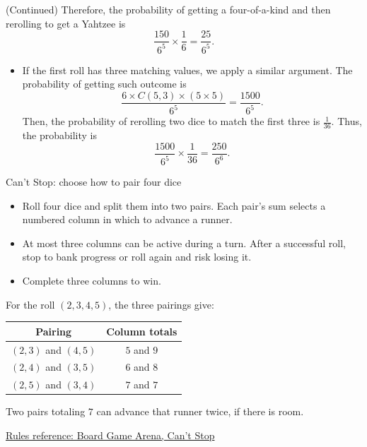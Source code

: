 \begin{frame}
\begin{sol} (Continued)
Therefore, the probability of getting a four-of-a-kind and then rerolling to get a Yahtzee is 
\[\frac{150}{6^5} \times \frac{1}{6} = \frac{25}{6^5}.\]
\begin{itemize}
\item If the first roll has three matching values, we apply a similar argument. The probability of getting such outcome is 
\[\frac{6 \times C(5,3) \times (5 \times 5)}{6^5} = \frac{1500}{6^5}.\] 
Then, the probability of rerolling two dice to match the first three is $\frac{1}{36}$. Thus, the probability is 
\[\frac{1500}{6^5} \times \frac{1}{36} = \frac{250}{6^6}.\]
\end{itemize}
\end{sol}
\end{frame}

\begin{frame}{Can't Stop: choose how to pair four dice}
\small
\begin{itemize}
\item Roll four dice and split them into two pairs. Each pair's sum
selects a numbered column in which to advance a runner.
\item At most three columns can be active during a turn. After a
successful roll, stop to bank progress or roll again and risk losing it.
\item Complete three columns to win.
\end{itemize}
For the roll $(2,3,4,5)$, the three pairings give:
\begin{center}
\begin{tabular}{c|c}
Pairing & Column totals \\
\hline
$(2,3)$ and $(4,5)$ & $5$ and $9$ \\
$(2,4)$ and $(3,5)$ & $6$ and $8$ \\
$(2,5)$ and $(3,4)$ & $7$ and $7$
\end{tabular}
\end{center}
Two pairs totaling $7$ can advance that runner twice, if there is room.

\medskip
{\footnotesize\href{https://en.boardgamearena.com/gamepanel?game=cantstop}{Rules reference: Board Game Arena, Can't Stop}}
\end{frame}

